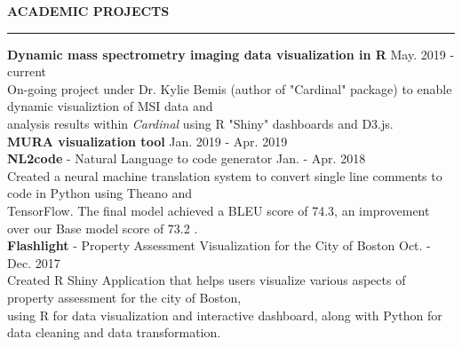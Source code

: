\documentclass[a4paper]{article}
\newcommand{\myline}{\par
  \kern2pt %
  \hrule height 0.5pt
  \kern2pt %
}
\newcommand{\mybullet}{
	\indent \textbullet \hspace*{2mm}
}
\newcommand{\linetab}{
  \\ \hspace*{9mm}
}
\begin{document}
	
	
\noindent
{\large \textbf{ACADEMIC PROJECTS}}
\myline 
\smallskip

      \noindent
      \textbf{Dynamic mass spectrometry imaging data visualization in R}
      \hfill May. 2019 - current \\
      \mybullet On-going project under Dr. Kylie Bemis (author of "Cardinal" package) to enable dynamic visualiztion of MSI data and \linetab analysis results within \textit{Cardinal} using R "Shiny" dashboards and D3.js. \\

      \noindent
      \textbf{MURA visualization tool}
      \hfill Jan. 2019 - Apr. 2019 \\

			\noindent
			\textbf{NL2code} - Natural Language to code generator
			\hfill Jan. - Apr. 2018 \\
			\mybullet Created a neural machine translation system to convert single line comments 
			to code in Python using Theano and \\ 
			\hspace*{9mm} TensorFlow. The final model achieved a BLEU score of 74.3, an improvement 
			over our Base model score of 73.2 . \\

			\noindent
			\textbf{Flashlight} - Property Assessment Visualization for the City of Boston 
			\hfill Oct. - Dec. 2017 \\
			\mybullet Created R Shiny Application that helps users visualize various aspects of 
			property assessment for the city of  Boston, \\ \hspace*{9mm} using 
			R for data visualization and interactive dashboard, along with Python for data cleaning 
			and data transformation. \\
			
\end{document}
